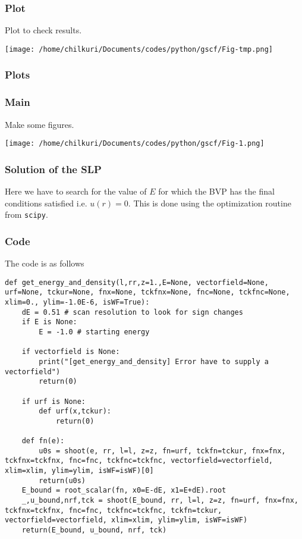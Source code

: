 \documentclass[11pt,a4paper]{article}
\begin{document}
\subsubsection{Plot}
\label{sec:org10385c5}
Plot to check results.
\begin{center}
\texttt{[image: /home/chilkuri/Documents/codes/python/gscf/Fig-tmp.png]}
\end{center}

\subsubsection{Plots}
\label{sec:org19a0430}
\subsubsection{Main}
\label{sec:org9949894}
Make some figures.
\begin{center}
\texttt{[image: /home/chilkuri/Documents/codes/python/gscf/Fig-1.png]}
\end{center}

\subsubsection{Solution of the SLP}
\label{sec:org9675cca}

Here we have to search for the value of \(E\)
for which the BVP has the final conditions satisfied
i.e. \(u(r)=0\). This is done using the optimization
routine from \texttt{scipy}.

\subsubsection{Code}
\label{sec:orgd9e4e59}

The code is as follows

\begin{verbatim}
def get_energy_and_density(l,rr,z=1.,E=None, vectorfield=None, urf=None, tckur=None, fnx=None, tckfnx=None, fnc=None, tckfnc=None, xlim=0., ylim=-1.0E-6, isWF=True):
    dE = 0.51 # scan resolution to look for sign changes
    if E is None:
        E = -1.0 # starting energy

    if vectorfield is None:
        print("[get_energy_and_density] Error have to supply a vectorfield")
        return(0)

    if urf is None:
        def urf(x,tckur):
            return(0)

    def fn(e):
        u0s = shoot(e, rr, l=l, z=z, fn=urf, tckfn=tckur, fnx=fnx, tckfnx=tckfnx, fnc=fnc, tckfnc=tckfnc, vectorfield=vectorfield, xlim=xlim, ylim=ylim, isWF=isWF)[0]
        return(u0s)
    E_bound = root_scalar(fn, x0=E-dE, x1=E+dE).root
    _,u_bound,nrf,tck = shoot(E_bound, rr, l=l, z=z, fn=urf, fnx=fnx, tckfnx=tckfnx, fnc=fnc, tckfnc=tckfnc, tckfn=tckur, vectorfield=vectorfield, xlim=xlim, ylim=ylim, isWF=isWF)
    return(E_bound, u_bound, nrf, tck)
\end{verbatim}
\end{document}

